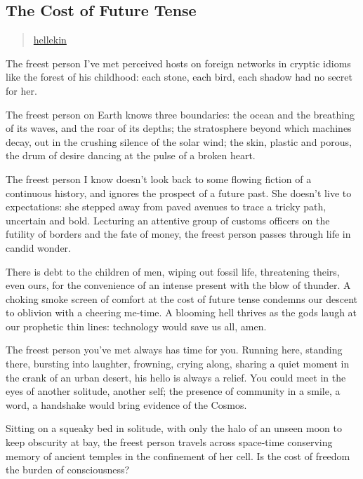 \subsection{The Cost of Future Tense}\label{the-cost-of-future-tense}

\begin{quote}
\href{../appendix/attributions.html\#hellekin}{hellekin}
\end{quote}

The freest person I've met perceived hosts on foreign networks in
cryptic idioms like the forest of his childhood: each stone, each bird,
each shadow had no secret for her.

The freest person on Earth knows three boundaries: the ocean and the
breathing of its waves, and the roar of its depths; the stratosphere
beyond which machines decay, out in the crushing silence of the solar
wind; the skin, plastic and porous, the drum of desire dancing at the
pulse of a broken heart.

The freest person I know doesn't look back to some flowing fiction of a
continuous history, and ignores the prospect of a future past. She
doesn't live to expectations: she stepped away from paved avenues to
trace a tricky path, uncertain and bold. Lecturing an attentive group of
customs officers on the futility of borders and the fate of money, the
freest person passes through life in candid wonder.

There is debt to the children of men, wiping out fossil life,
threatening theirs, even ours, for the convenience of an intense present
with the blow of thunder. A choking smoke screen of comfort at the cost
of future tense condemns our descent to oblivion with a cheering
me-time. A blooming hell thrives as the gods laugh at our prophetic thin
lines: technology would save us all, amen.

The freest person you've met always has time for you. Running here,
standing there, bursting into laughter, frowning, crying along, sharing
a quiet moment in the crank of an urban desert, his hello is always a
relief. You could meet in the eyes of another solitude, another self;
the presence of community in a smile, a word, a handshake would bring
evidence of the Cosmos.

Sitting on a squeaky bed in solitude, with only the halo of an unseen
moon to keep obscurity at bay, the freest person travels across
space-time conserving memory of ancient temples in the confinement of
her cell. Is the cost of freedom the burden of consciousness?

